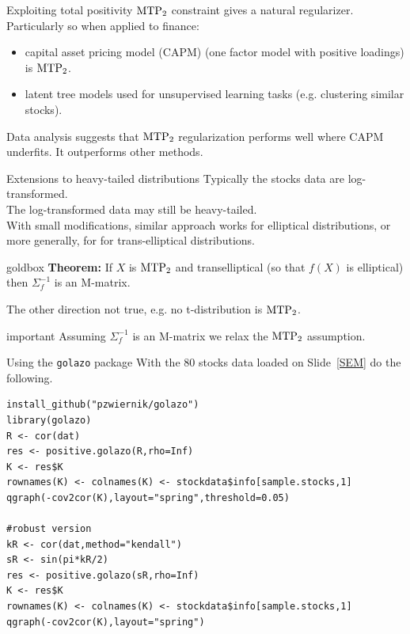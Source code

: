 \documentclass[dvipsnames,aspectratio=169]{beamer} %
\newcommand{\mtp}{{\rm MTP}_{2}}
\begin{document}
	\begin{frame}{Exploiting total positivity}
		$\mtp$ constraint gives a natural regularizer.\\[.3cm]
				
		Particularly so when applied to finance:
		\begin{itemize}
			\item \alert{capital asset pricing model (CAPM)} (one factor model with positive loadings) is $\mtp$.  
			\item latent tree models used for unsupervised learning tasks (e.g. clustering similar stocks).
		\end{itemize}
	\bigskip
	
	Data analysis suggests that $\mtp$ regularization performs well where CAPM underfits. It outperforms other methods.
			\end{frame}

\begin{frame}{Extensions to heavy-tailed distributions}
Typically the stocks data  are log-transformed.\\[.4cm]
The log-transformed data may still	be heavy-tailed.\\[.4cm]
With small modifications, similar approach works for elliptical distributions, or more generally, for for \alert{trans-elliptical distributions}.
\medskip

\begin{beamercolorbox}[wd=\paperwidth,sep=5pt]{goldbox}
	\textbf{Theorem: } If $X$ is $\mtp$ and transelliptical (so that $f(X)$ is elliptical) then $\Sigma^{-1}_f$ is an M-matrix.	
	\end{beamercolorbox}
	\medskip
	
	The other direction not true, e.g. \alert{no} t-distribution is $\mtp$.
		\begin{beamercolorbox}[wd=\paperwidth,sep=5pt]{important}
		Assuming $\Sigma^{-1}_f$ is an M-matrix we relax the $\mtp$ assumption.
	\end{beamercolorbox}
	\medskip

\end{frame}


\begin{frame}[fragile]{Using the \texttt{golazo} package}
With the 80 stocks data loaded on Slide~\ref{SEM} do the following.
	\begin{lstlisting}
install_github("pzwiernik/golazo")
library(golazo)
R <- cor(dat)
res <- positive.golazo(R,rho=Inf)
K <- res$K
rownames(K) <- colnames(K) <- stockdata$info[sample.stocks,1]
qgraph(-cov2cor(K),layout="spring",threshold=0.05)

#robust version
kR <- cor(dat,method="kendall")
sR <- sin(pi*kR/2)
res <- positive.golazo(sR,rho=Inf)
K <- res$K
rownames(K) <- colnames(K) <- stockdata$info[sample.stocks,1]
qgraph(-cov2cor(K),layout="spring")		
	\end{lstlisting}
\end{frame}
\end{document}
